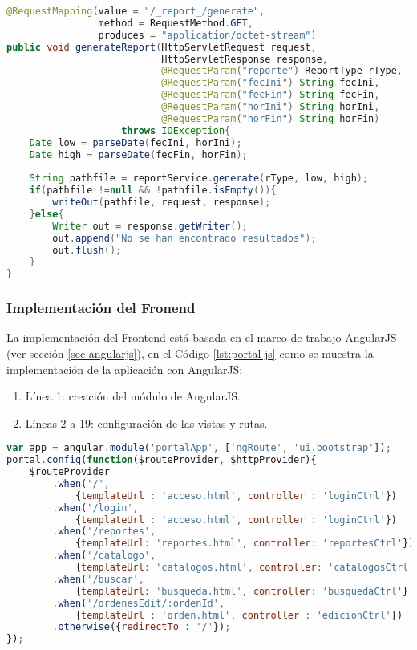\begin{enumerate}
\begin{lstlisting}[language=Java, caption={Servicio Web para generar un reporte.}, captionpos=b, label={lst:report-controller-gen}]
@RequestMapping(value = "/_report_/generate",
				method = RequestMethod.GET,
				produces = "application/octet-stream")
public void generateReport(HttpServletRequest request,
						   HttpServletResponse response,
						   @RequestParam("reporte") ReportType rType,
						   @RequestParam("fecIni") String fecIni,
						   @RequestParam("fecFin") String fecFin,
						   @RequestParam("horIni") String horIni,
						   @RequestParam("horFin") String horFin)
					throws IOException{
	Date low = parseDate(fecIni, horIni);
	Date high = parseDate(fecFin, horFin);
	
	String pathfile = reportService.generate(rType, low, high);
	if(pathfile !=null && !pathfile.isEmpty()){
		writeOut(pathfile, request, response);
	}else{
		Writer out = response.getWriter();
		out.append("No se han encontrado resultados");
		out.flush();
	}
}
\end{lstlisting}

\end{enumerate}


\subsubsection{Implementación del Fronend}
La implementación del Frontend está basada en el marco de trabajo AngularJS (ver sección \ref{sec-angularjs}), en el Código \ref{lst:portal-js} como se muestra la implementación de la aplicación con AngularJS:
\begin{enumerate}
	\item Línea 1: creación del módulo de AngularJS.
	\item Líneas 2 a 19: configuración de las vistas y rutas.
\end{enumerate}
\begin{lstlisting}[language=Javascript, caption={Módulo de AngularJS para el portalWeb}, captionpos=b, label={lst:portal-js}]
var app = angular.module('portalApp', ['ngRoute', 'ui.bootstrap']);
portal.config(function($routeProvider, $httpProvider){
	$routeProvider
		.when('/',
			{templateUrl : 'acceso.html', controller : 'loginCtrl'})
		.when('/login',
			{templateUrl : 'acceso.html', controller : 'loginCtrl'})
		.when('/reportes',
			{templateUrl: 'reportes.html', controller: 'reportesCtrl'})
		.when('/catalogo',
			{templateUrl: 'catalogos.html', controller: 'catalogosCtrl'})
		.when('/buscar',
			{templateUrl: 'busqueda.html', controller: 'busquedaCtrl'})
		.when('/ordenesEdit/:ordenId',
			{templateUrl : 'orden.html', controller : 'edicionCtrl'})
		.otherwise({redirectTo : '/'});
});
\end{lstlisting}

